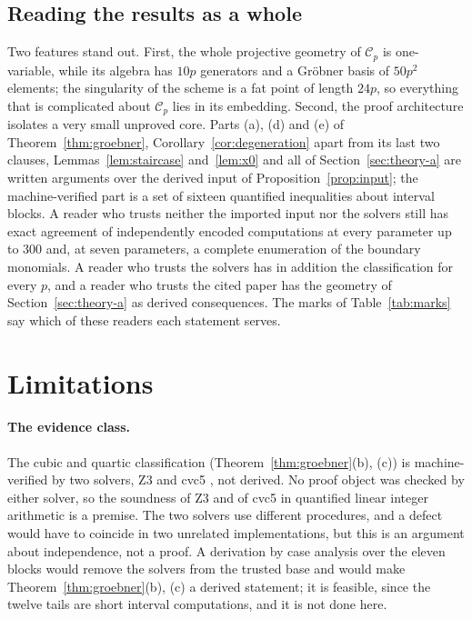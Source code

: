 \documentclass[11pt]{article}
\theoremstyle{definition}
\theoremstyle{remark}
\newcommand{\Cfiber}{\mathcal{C}}
\begin{document}
\subsection{Reading the results as a whole}

Two features stand out. First, the whole projective geometry of $\Cfiber_p$ is one-variable, while
its algebra has $10p$ generators and a Gr\"obner basis of $50p^2$ elements; the singularity of the
scheme is a fat point of length $24p$, so everything that is complicated about $\Cfiber_p$ lies in its embedding.
Second, the proof architecture isolates a very small unproved core. Parts (a), (d) and (e) of
Theorem~\ref{thm:groebner}, Corollary~\ref{cor:degeneration} apart from its last two clauses, Lemmas~\ref{lem:staircase}
and~\ref{lem:x0} and all of Section~\ref{sec:theory-a} are written arguments over the derived input of
Proposition~\ref{prop:input}; the machine-verified part is a set of sixteen quantified
inequalities about interval blocks. A reader who trusts neither the imported input nor the solvers
still has exact agreement of independently encoded computations at every parameter up to $300$
and, at seven parameters, a complete enumeration of the boundary monomials. A reader who trusts the
solvers has in addition the classification for every $p$, and a reader who trusts the cited paper
has the geometry of Section~\ref{sec:theory-a} as derived consequences. The marks of
Table~\ref{tab:marks} say which of these readers each statement serves.

\section{Limitations}\label{sec:limits}

\paragraph{The evidence class.} The cubic and quartic classification (Theorem~\ref{thm:groebner}(b),
(c)) is machine-verified by two solvers, Z3 \cite{DeMouraBjorner2008} and cvc5 \cite{Barbosa2022}, not
derived. No proof object was checked by either
solver, so the soundness of Z3 and of cvc5 in quantified linear integer arithmetic is a premise.
The two solvers use different procedures, and a defect would have to coincide in two unrelated
implementations, but this is an argument about independence, not a proof. A derivation by case analysis over
the eleven blocks would remove the solvers from the trusted base and would make Theorem~\ref{thm:groebner}(b), (c) a derived statement; it is feasible, since the twelve tails are
short interval computations, and it is not done here.
\end{document}
